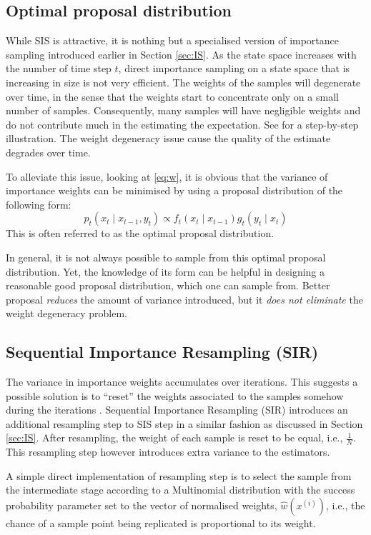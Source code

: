 \subsection{Optimal proposal distribution}
While SIS is attractive, it is nothing but a specialised version of importance sampling introduced earlier in Section \ref{sec:IS}. As the state space increases with the number of time step $t$, direct importance sampling on a state space that is increasing in size is not very efficient. The weights of the samples will degenerate over time, in the sense that the weights start to concentrate only on a small number of samples. Consequently, many samples will have negligible weights and do not contribute much in the estimating the expectation. See \cite{JAM10} for a step-by-step illustration. The weight degeneracy issue cause the quality of the estimate degrades over time.

To alleviate this issue, looking at \eqref{eq:w}, it is obvious that the variance of importance weights can be minimised by using a proposal distribution of the following form:
\begin{equation}
 p_{t}(x_{t} \mid x_{t-1}, y_t) \propto f_{t}(x_{t} \mid x_{t-1}) g_{t}(y_{t} \mid x_t)
\end{equation}
This is often referred to as the optimal proposal distribution.

In general, it is not always possible to sample from this optimal proposal distribution. Yet, the knowledge of its form can be helpful in designing a reasonable good proposal distribution, which one can sample from. Better
proposal \emph{reduces} the amount of variance introduced, but it \emph{does not eliminate} the weight degeneracy problem.

\subsection{Sequential Importance Resampling (SIR)}
The variance in importance weights accumulates over iterations. This suggests a possible solution is to ``reset'' the weights associated to the samples somehow during the iterations \cite{JAM10}. Sequential Importance Resampling (SIR) introduces an additional resampling step to SIS step in a similar fashion as discussed in Section \ref{sec:IS}. After resampling, the weight of each sample is reset to be equal, i.e., $\frac{1}{N}$. This resampling step however introduces extra variance to the estimators.

A simple direct implementation of resampling step is to select the sample from the intermediate stage according to a Multinomial distribution with the success probability parameter set to the vector of normalised weights, $\hat{w}(x^{(i)})$, i.e., the chance of a sample point being replicated is proportional to its weight. 

